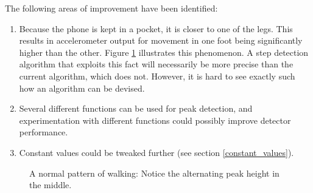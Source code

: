 The following areas of improvement have been identified:
\begin{enumerate}
\item Because the phone is kept in a pocket, it is closer to one of the legs. This results in accelerometer output for movement in one foot being significantly higher than the other. Figure \ref{fig:FilipWalks} illustrates this phenomenon. A step detection algorithm that exploits this fact will necessarily be more precise than the current algorithm, which does not. However, it is hard to see exactly such how an algorithm can be devised.
\item Several different functions can be used for peak detection, and experimentation with different functions could possibly improve detector performance.
\item Constant values could be tweaked further (see section \ref{constant_values}).
\end{enumerate}

\begin{figure}[p]

\setlength\fboxsep{0pt}
\setlength\fboxrule{1pt}\noindent{}

\caption{A normal pattern of walking: Notice the alternating peak height in the middle.}
\label{fig:FilipWalks}
\end{figure}